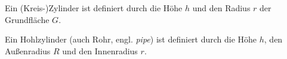 
  Ein (Kreis-)Zylinder ist definiert durch die H\"ohe $h$ und den
  Radius $r$ der Grundfl\"ache $G$.

  Ein Hohlzylinder (auch Rohr, engl. \emph{pipe}) ist definiert durch die
  H\"ohe $h$, den Au\ss enradius $R$ und den Innenradius $r$.

  \begin{figure}[h]
    \centering
    \hfil
  \end{figure}


